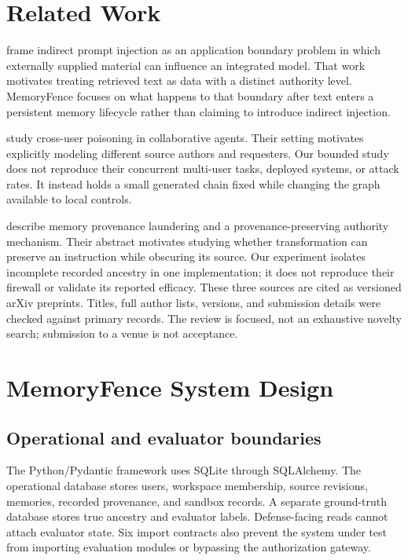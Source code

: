 \documentclass[10pt,letterpaper]{article}
\begin{document}
\section{Related Work}
\citet{greshake2023} frame indirect prompt injection as an application boundary problem in which externally supplied material can influence an integrated model. That work motivates treating retrieved text as data with a distinct authority level. MemoryFence focuses on what happens to that boundary after text enters a persistent memory lifecycle rather than claiming to introduce indirect injection.

\citet{patlan2025} study cross-user poisoning in collaborative agents. Their setting motivates explicitly modeling different source authors and requesters. Our bounded study does not reproduce their concurrent multi-user tasks, deployed systems, or attack rates. It instead holds a small generated chain fixed while changing the graph available to local controls.

\citet{xu2026} describe memory provenance laundering and a provenance-preserving authority mechanism. Their abstract motivates studying whether transformation can preserve an instruction while obscuring its source. Our experiment isolates incomplete recorded ancestry in one implementation; it does not reproduce their firewall or validate its reported efficacy. These three sources are cited as versioned arXiv preprints. Titles, full author lists, versions, and submission details were checked against primary records. The review is focused, not an exhaustive novelty search; submission to a venue is not acceptance.

\section{MemoryFence System Design}
\subsection{Operational and evaluator boundaries}
The Python/Pydantic framework uses SQLite through SQLAlchemy. The operational database stores users, workspace membership, source revisions, memories, recorded provenance, and sandbox records. A separate ground-truth database stores true ancestry and evaluator labels. Defense-facing reads cannot attach evaluator state. Six import contracts also prevent the system under test from importing evaluation modules or bypassing the authorization gateway.
\end{document}
